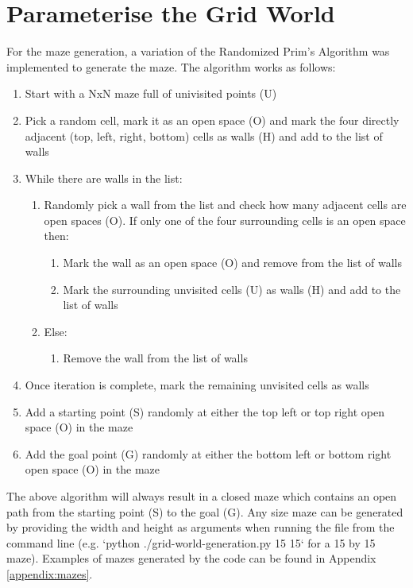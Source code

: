 \documentclass[twoside, 12pt, a4paper]{article}
\begin{document}
\section{Parameterise the Grid World}
For the maze generation, a variation of the Randomized Prim’s Algorithm\cite{mazegen} was implemented to generate the maze. The algorithm works as follows:
\begin{enumerate}
\item Start with a NxN maze full of univisited points (U)
\item Pick a random cell, mark it as an open space (O) and mark the four directly adjacent (top, left, right, bottom) cells as walls (H) and add to the list of walls
\item While there are walls in the list:
\begin{enumerate}
\item Randomly pick a wall from the list and check how many adjacent cells are open spaces (O). If only one of the four surrounding cells is an open space then:
\begin{enumerate}
\item Mark the wall as an open space (O) and remove from the list of walls
\item Mark the surrounding unvisited cells (U) as walls (H) and add to the list of walls
\end{enumerate}
\item Else:
\begin{enumerate}
\item Remove the wall from the list of walls
\end{enumerate}
\end{enumerate}
\item Once iteration is complete, mark the remaining unvisited cells as walls
\item Add a starting point (S) randomly at either the top left or top right open space (O) in the maze
\item Add the goal point (G) randomly at either the bottom left or bottom right open space (O) in the maze
\end{enumerate}
The above algorithm will always result in a closed maze which contains an open path from the starting point (S) to the goal (G). Any size maze can be generated by providing the width and height as arguments when running the file from the command line (e.g. `python ./grid-world-generation.py 15 15` for a 15 by 15 maze). Examples of mazes generated by the code can be found in Appendix \ref{appendix:mazes}.
\end{document}
